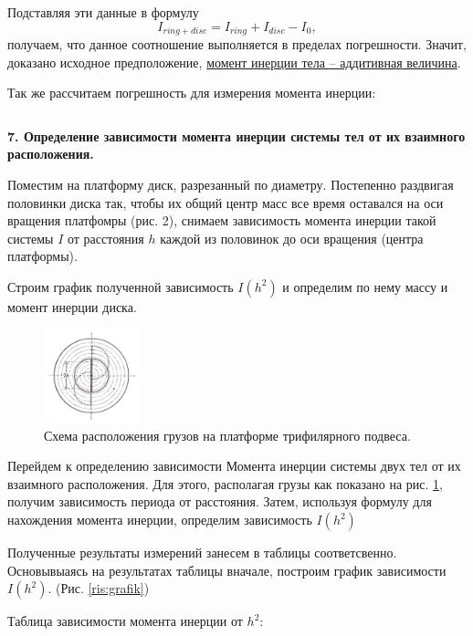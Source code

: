 \documentclass[a4paper,12pt]{article} %
\begin{document}
		Подставляя эти данные в формулу $$ I_{ring + disc} = I_{ring} + I_{disc} - I_{0}, $$ получаем, что данное соотношение выполняется в пределах погрешности. Значит, доказано исходное предположение, \underline{момент инерции тела -- аддитивная величина}.

Так же рассчитаем погрешность для измерения момента инерции: 

\[ 	 \]


{\bf 7. Определение зависимости момента инерции системы тел от их взаимного расположения.}

Поместим на платформу диск, разрезанный по диаметру. Постепенно раздвигая половинки диска так, чтобы их общий центр масс все время оставался на оси вращения платфомры (рис. 2), снимаем зависимость момента инерции такой системы $I$ от расстояния $h$ каждой из половинок до оси вращения (центра платформы).

Строим график полученной зависимость $I(h^2)$ и определим по нему массу и момент инерции диска.

\begin{figure}
\vspace{-3em}
\includegraphics[width=0.25\textwidth]{position}
\caption{Схема расположения грузов на платформе трифилярного подвеса.}
\label{ris:position}
\end{figure}
			
Перейдем к определению зависимости Момента инерции системы двух тел от их взаимного расположения. Для этого, располагая грузы как показано на рис. \ref{ris:position}, получим зависимость периода от расстояния. Затем, используя формулу для нахождения момента инерции, определим зависимость $ I(h^{2}) $
	
Полученные результаты измерений занесем в таблицы  соответсвенно. Основывыаясь на результатах таблицы вначале, построим график зависимости $ I(h^{2}) $. (Рис. \ref{ris:grafik})
		
Таблица зависимости момента инерции от $h^2$:
\end{document}
